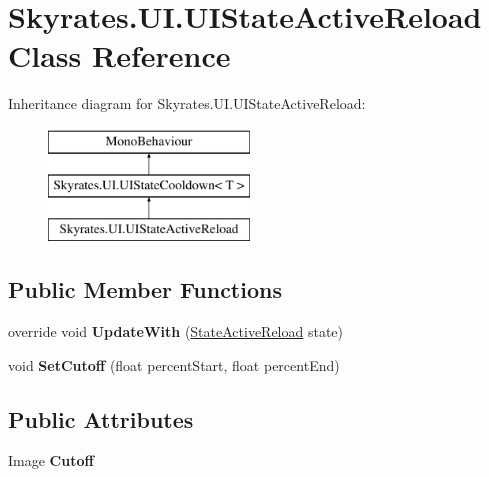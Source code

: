 \hypertarget{class_skyrates_1_1_u_i_1_1_u_i_state_active_reload}{\section{Skyrates.\-U\-I.\-U\-I\-State\-Active\-Reload Class Reference}
\label{class_skyrates_1_1_u_i_1_1_u_i_state_active_reload}
}
Inheritance diagram for Skyrates.\-U\-I.\-U\-I\-State\-Active\-Reload\-:\begin{figure}[H]
\begin{center}
\leavevmode
\includegraphics[height=3.000000cm]{class_skyrates_1_1_u_i_1_1_u_i_state_active_reload}
\end{center}
\end{figure}
\subsection*{Public Member Functions}
\begin{DoxyCompactItemize}
\item 
\hypertarget{class_skyrates_1_1_u_i_1_1_u_i_state_active_reload_aeaa1ae4656c3c8b40f93cad595b262cf}{override void {\bfseries Update\-With} (\hyperlink{class_skyrates_1_1_misc_1_1_state_active_reload}{State\-Active\-Reload} state)}\label{class_skyrates_1_1_u_i_1_1_u_i_state_active_reload_aeaa1ae4656c3c8b40f93cad595b262cf}

\item 
\hypertarget{class_skyrates_1_1_u_i_1_1_u_i_state_active_reload_a86ce8a58d5796a4a0c3323543ed0acca}{void {\bfseries Set\-Cutoff} (float percent\-Start, float percent\-End)}\label{class_skyrates_1_1_u_i_1_1_u_i_state_active_reload_a86ce8a58d5796a4a0c3323543ed0acca}

\end{DoxyCompactItemize}
\subsection*{Public Attributes}
\begin{DoxyCompactItemize}
\item 
\hypertarget{class_skyrates_1_1_u_i_1_1_u_i_state_active_reload_ab90308da3c0f0dbbaa790b8f8c099c2b}{Image {\bfseries Cutoff}}\label{class_skyrates_1_1_u_i_1_1_u_i_state_active_reload_ab90308da3c0f0dbbaa790b8f8c099c2b}

\end{DoxyCompactItemize}
